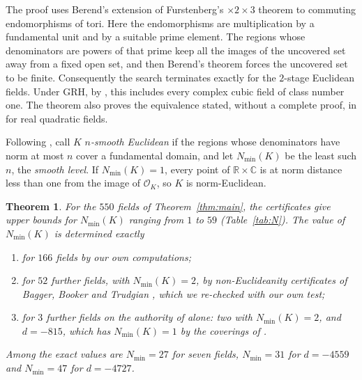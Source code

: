 \documentclass[11pt]{amsart}
\newtheorem{theorem}{Theorem}[section]
\theoremstyle{definition}
\theoremstyle{remark}
\numberwithin{equation}{section}
\newcommand{\R}{\mathbb{R}}
\newcommand{\C}{\mathbb{C}}
\newcommand{\cO}{\mathcal{O}}
\newcommand{\Nmin}{N_{\min}}
\begin{document}
The proof uses Berend's extension of Furstenberg's $\times2\times3$ theorem to commuting
endomorphisms of tori. Here the endomorphisms are multiplication by a fundamental unit and by
a suitable prime element. The regions whose denominators are powers of that prime keep all the
images of the uncovered set away from a fixed open set, and then Berend's theorem forces the
uncovered set to be finite. Consequently the search terminates exactly for the
$2$-stage Euclidean fields. Under GRH, by \cite{CW}, this includes every complex cubic field
of class number one. The theorem also proves the equivalence stated, without a complete
proof, in \cite[Proposition~2.2]{GM} for real quadratic fields.

Following \cite{GM}, call
$K$ \emph{$n$-smooth Euclidean} if the regions whose denominators have norm at most $n$ cover a
fundamental domain, and let $\Nmin(K)$ be the least such $n$, the \emph{smooth level}. If
$\Nmin(K)=1$, every point of $\R\times\C$ is at norm distance less than one from the image of
$\cO_K$, so $K$ is norm-Euclidean.

\begin{theorem}\label{thm:smooth}
For the $550$ fields of Theorem~\ref{thm:main}, the certificates give upper bounds for
$\Nmin(K)$ ranging from $1$ to $59$ (Table~\ref{tab:N}). The value of $\Nmin(K)$ is determined
exactly
\begin{enumerate}
\item[(a)] for $166$ fields by our own computations;
\item[(b)] for $52$ further fields, with $\Nmin(K)=2$, by non-Euclideanity certificates of
Bagger, Booker and Trudgian \cite{BBT}, which we re-checked with our own test;
\item[(c)] for $3$ further fields on the authority of \cite{BBT} alone: two with $\Nmin(K)=2$,
and $d=-815$, which has $\Nmin(K)=1$ by the coverings of \cite{CL,BBT}.
\end{enumerate}
Among the exact values are $\Nmin=27$ for seven fields, $\Nmin=31$ for $d=-4559$ and
$\Nmin=47$ for $d=-4727$.
\end{theorem}
\end{document}
